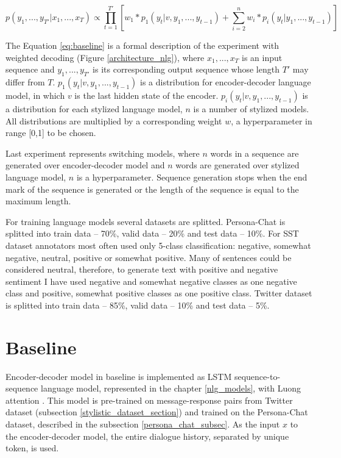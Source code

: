 
\begin{equation} \label{eq:baseline}
p(y_1, ... , y_{T'}|x_1, ... , x_T) \propto \prod_{t=1}^{T'} [w_1 * p_1(y_t|v, y_1, ... , y_{t-1}) + \sum_{i=2}^n w_i * p_i(y_t| y_1, ... , y_{t-1})]
\end{equation}

The Equation \ref{eq:baseline} is a formal description of the experiment with weighted decoding (Figure \ref{architecture_nlg}), where $x_1, ... , x_T$ is an input sequence and $y_1, ... , y_{T'}$ is its corresponding output sequence whose length $T'$ may differ from $T$. $p_1(y_t|v, y_1, ... , y_{t-1})$ is a distribution for encoder-decoder language model, in which $v$ is the last hidden state of the encoder. $p_i(y_t|v, y_1, ... , y_{t-1})$ is a distribution for each stylized language model, $n$ is a number of stylized models. All distributions are multiplied by a corresponding weight $w$, a hyperparameter in range [0,1] to be chosen.

Last experiment represents switching models, where $n$ words in a sequence are generated over encoder-decoder model and $n$ words are generated over stylized language model, $n$ is a hyperparameter. Sequence generation stops when the end mark of the sequence is generated or the length of the sequence is equal to the maximum length. 

For training language models several datasets are splitted. Persona-Chat is splitted into train data -- 70\%, valid data -- 20\% and test data -- 10\%. For SST dataset annotators most often used only 5-class classification: negative, somewhat negative, neutral, positive or somewhat positive. Many of sentences could be considered neutral, therefore, to generate text with positive and negative sentiment I have used negative and somewhat negative classes as one negative class and positive, somewhat positive classes as one positive class. Twitter dataset is splitted into train data -- 85\%, valid data -- 10\% and test data -- 5\%.

\section{Baseline}
Encoder-decoder model in baseline is implemented as LSTM sequence-to-sequence language model, represented in the chapter \ref{nlg_models}, with Luong attention \cite{luong2015effective}. This model is pre-trained on message-response pairs from Twitter dataset (subsection \ref{stylistic_dataset_section}) and trained on the Persona-Chat dataset, described in the subsection \ref{persona_chat_subsec}. As the input $x$ to the encoder-decoder model, the entire dialogue history, separated by unique token, is used.

